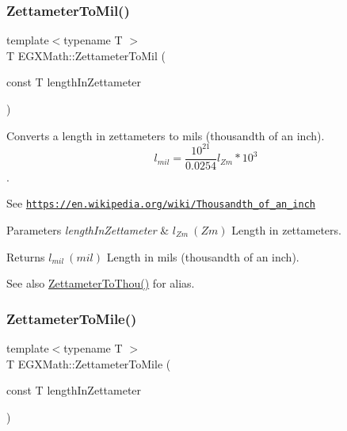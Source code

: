 \subsubsection{\texorpdfstring{Zettameter\+To\+Mil()}{ZettameterToMil()}}
{\footnotesize\ttfamily template$<$typename T $>$ \\
T E\+G\+X\+Math\+::\+Zettameter\+To\+Mil (\begin{DoxyParamCaption}\item[{const T}]{length\+In\+Zettameter }\end{DoxyParamCaption})}



Converts a length in zettameters to mils (thousandth of an inch). \[ l_{mil}= \frac{10^{21}}{0.0254} l_{Zm} * 10^{3} \]. 

See \href{https://en.wikipedia.org/wiki/Thousandth_of_an_inch}{\tt https\+://en.\+wikipedia.\+org/wiki/\+Thousandth\+\_\+of\+\_\+an\+\_\+inch} 
\begin{DoxyParams}{Parameters}
{\em length\+In\+Zettameter} & $ l_{Zm}\ (Zm)$ Length in zettameters. \\
\hline
\end{DoxyParams}
\begin{DoxyReturn}{Returns}
$ l_{mil}\ (mil)$ Length in mils (thousandth of an inch). 
\end{DoxyReturn}
\begin{DoxySeeAlso}{See also}
\mbox{\hyperlink{group___e_g_x_math-_conversions-_length_conversions-_s_i-_zettameter-_imperial_gacd92ac6ab3300ca582966510e369a381}{Zettameter\+To\+Thou()}} for alias. 
\end{DoxySeeAlso}
\mbox{\label{group___e_g_x_math-_conversions-_length_conversions-_s_i-_zettameter-_imperial_ga217b12dd9c920150cbcf50413e98dd47}} 
\subsubsection{\texorpdfstring{Zettameter\+To\+Mile()}{ZettameterToMile()}}
{\footnotesize\ttfamily template$<$typename T $>$ \\
T E\+G\+X\+Math\+::\+Zettameter\+To\+Mile (\begin{DoxyParamCaption}\item[{const T}]{length\+In\+Zettameter }\end{DoxyParamCaption})}



